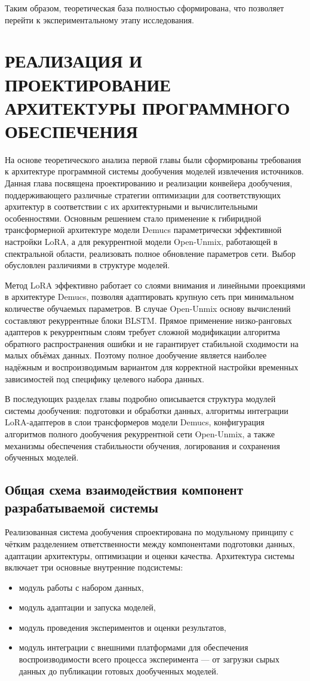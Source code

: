 \documentclass[14pt]{extarticle}
\begin{document}
Таким образом, теоретическая база полностью сформирована, что позволяет перейти к экспериментальному этапу исследования.

\section{\MakeUppercase{Реализация и проектирование архитектуры программного обеспечения}}

На основе теоретического анализа первой главы были сформированы требования к архитектуре программной системы дообучения моделей 
извлечения источников. Данная глава посвящена проектированию и реализации конвейера дообучения, поддерживающего различные стратегии оптимизации
для соответствующих архитектур в соответствии с их архитектурными и вычислительными особенностями.
Основным решением стало применение к гибиридной трансформерной архитектуре модели Demucs параметрически эффективной настройки LoRA, а для
рекуррентной модели Open-Unmix, работающей в спектральной области, реализовать полное обновление параметров сети.
Выбор обусловлен различиями в структуре моделей. 

Метод LoRA эффективно работает со слоями внимания и линейными проекциями в архитектуре Demucs, позволяя адаптировать крупную сеть при
минимальном количестве обучаемых параметров. В случае Open-Unmix основу вычислений составляют рекуррентные блоки BLSTM.
Прямое применение низко-ранговых адаптеров к рекуррентным слоям требует сложной модификации алгоритма обратного распространения ошибки 
и не гарантирует стабильной сходимости на малых объёмах данных. Поэтому полное дообучение является наиболее надёжным и воспроизводимым 
вариантом для корректной настройки временных зависимостей под специфику целевого набора данных.

В последующих разделах главы подробно описывается структура модулей системы дообучения: подготовки и обработки данных, 
алгоритмы интеграции LoRA-адаптеров в слои трансформеров модели Demucs, конфигурация алгоритмов полного дообучения рекуррентной сети Open-Unmix,
а также механизмы обеспечения стабильности обучения, логирования 
и сохранения обученных моделей.

\subsection{Общая схема взаимодействия компонент разрабатываемой системы}
Реализованная система дообучения спроектирована по модульному принципу с чётким разделением ответственности между 
компонентами подготовки данных, адаптации архитектуры, оптимизации и оценки качества. 
Архитектура системы включает три основные внутренние подсистемы:
\begin{itemize}[label=$\bullet$, wide]
	\item модуль работы с набором данных,
	\item модуль адаптации и запуска моделей,
	\item модуль проведения экспериментов и оценки результатов,
	\item модуль интеграции с внешними платформами для обеспечения воспроизводимости всего процесса эксперимента — от загрузки сырых данных до публикации готовых дообученных моделей.
\end{itemize}
\end{document}
